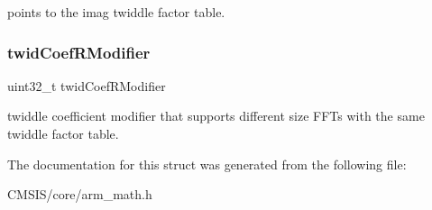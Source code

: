 points to the imag twiddle factor table. \mbox{\label{structarm__rfft__instance__f32_a5b06f7f76c018db993fe6acc5708c589}} 
\subsubsection{\texorpdfstring{twid\+Coef\+R\+Modifier}{twidCoefRModifier}}
{\footnotesize\ttfamily uint32\+\_\+t twid\+Coef\+R\+Modifier}

twiddle coefficient modifier that supports different size F\+F\+Ts with the same twiddle factor table. 

The documentation for this struct was generated from the following file\+:\begin{DoxyCompactItemize}
\item 
C\+M\+S\+I\+S/core/arm\+\_\+math.\+h\end{DoxyCompactItemize}
